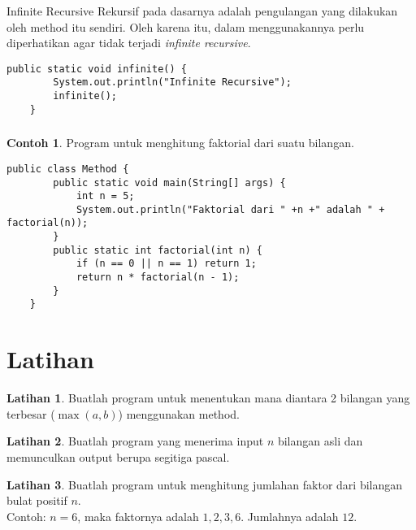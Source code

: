 \documentclass[aspectratio=169]{beamer}
\theoremstyle{definition}
\newtheorem{latihan}{Latihan}
\newtheorem*{contoh}{Contoh}
\begin{document}
    \begin{frame}[fragile]
        \frametitle{\insertsection}
        \begin{alertblock}{Infinite Recursive}
            Rekursif pada dasarnya adalah pengulangan yang dilakukan oleh method itu sendiri. Oleh karena itu, dalam menggunakannya perlu diperhatikan agar tidak terjadi \textit{infinite recursive}.
        \end{alertblock}
        \begin{lstlisting}[caption={Infinite Recursive}]
    public static void infinite() {
        System.out.println("Infinite Recursive");
        infinite();
    }
        \end{lstlisting}
    \end{frame}

    \begin{frame}[fragile]
        \frametitle{\insertsection}
        \begin{contoh}
            Program untuk menghitung faktorial dari suatu bilangan.
        \end{contoh}
        \begin{lstlisting}[caption={Faktorial}]
    public class Method {
        public static void main(String[] args) {
            int n = 5;
            System.out.println("Faktorial dari " +n +" adalah " + factorial(n));
        }
        public static int factorial(int n) {
            if (n == 0 || n == 1) return 1;
            return n * factorial(n - 1);
        }
    }
        \end{lstlisting}
    \end{frame}

    \section{Latihan}
    \begin{frame}
        \begin{latihan}
            Buatlah program untuk menentukan mana diantara 2 bilangan yang terbesar ($\max(a, b)$) menggunakan method.
        \end{latihan}
        \begin{latihan}
            Buatlah program yang menerima input $n$ bilangan asli dan memunculkan output berupa segitiga pascal.
        \end{latihan}
        \begin{latihan}
            Buatlah program untuk menghitung jumlahan faktor dari bilangan bulat positif $n$.\\
            Contoh: $n=6$, maka faktornya adalah $1, 2, 3, 6$. Jumlahnya adalah $12$.
        \end{latihan}
    \end{frame}
\end{document}
